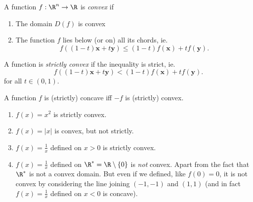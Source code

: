 \documentclass[a4paper]{article}
\begin{document}
\begin{defi}
  A function $f: \R^n \to \R$ is \emph{convex} if
  \begin{enumerate}
    \item The domain $D(f)$ is convex
    \item The function $f$ lies below (or on) all its chords, ie.
      \[
        f((1 - t)\mathbf{x} + t\mathbf{y}) \leq (1 - t)f(\mathbf{x}) + tf(\mathbf{y}). \tag{$*$}
      \]
  \end{enumerate}
  A function is \emph{strictly convex} if the inequality is strict, ie.
  \[
    f((1 - t)\mathbf{x} + t\mathbf{y}) < (1 - t)f(\mathbf{x}) + tf(\mathbf{y}).
  \]
  for all $t\in (0, 1)$.
  \begin{center}
  \end{center}

  A function $f$ is (strictly) concave iff $-f$ is (strictly) convex.
\end{defi}

\begin{eg}\leavevmode
  \begin{enumerate}
    \item $f(x) = x^2$ is strictly convex.
    \item $f(x) = |x|$ is convex, but not strictly.
    \item $f(x) = \frac{1}{x}$ defined on $x > 0$ is strictly convex.
    \item $f(x) = \frac{1}{x}$ defined on $\R^* = \R \setminus \{0\}$ is \emph{not} convex. Apart from the fact that $\R^*$ is not a convex domain. But even if we defined, like $f(0) = 0$, it is not convex by considering the line joining $(-1, -1)$ and $(1, 1)$ (and in fact $f(x) = \frac{1}{x}$ defined on $x < 0$ is concave).
  \end{enumerate}
\end{eg}
\end{document}
